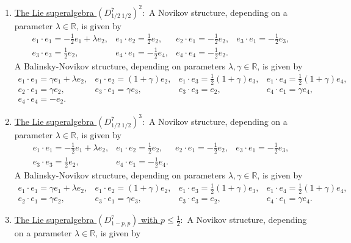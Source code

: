 \documentclass[12pt]{amsart}
\begin{document}
\begin{enumerate}
\[\begin{array}{llll}
e_2\cdot e_1=(\gamma-1)e_2, & e_3\cdot e_1=(\gamma-1)e_3, & e_3\cdot e_3= e_2, & e_4\cdot e_1=(\gamma -1)e_4,\\[2mm]
e_4\cdot e_4=e_2.
 \end{array}
 \]
 \item \underline{The Lie superalgebra $(D^{7}_{1/2\; 1/2})^2:$} A Novikov structure, depending on a parameter $\lambda \in \mathbb R$, is given by
 \[
 \begin{array}{llll}
e_1\cdot e_1=-\frac{1}{2} e_1 +\lambda e_2, &  e_1\cdot e_2=\frac{1}{2} e_2, &  e_2\cdot e_1= - \frac{1}{2} e_2,& e_3\cdot e_1=- \frac{1}{2} e_3, \\[2mm] e_3\cdot e_3=\frac{1}{2} e_2,& 
e_4 \cdot e_1=-\frac{1}{2} e_4, &  e_4\cdot e_4=-\frac{1}{2}e_2.
\end{array}
 \]
A Balinsky-Novikov structure, depending on parameters $\lambda, \gamma \in \mathbb R$,  is given by 
 \[
 \begin{array}{llll}
e_1 \cdot e_1= \gamma e_1+\lambda e_2, & e_1\cdot e_2= (1+\gamma) e_2, & e_1\cdot e_3=\frac{1}{2}(1+\gamma )e_3, & e_1\cdot e_4= \frac{1}{2}(1+\gamma)e_4,\\[2mm]
e_2\cdot e_1=\gamma e_2, & e_3\cdot e_1=\gamma e_3, & e_3\cdot e_3= e_2, & e_4\cdot e_1=\gamma e_4,\\[2mm]
e_4\cdot e_4=- e_2.
 \end{array}
 \]
  \item \underline{The Lie superalgebra $(D^{7}_{1/2 \; 1/2})^3:$} A Novikov structure, depending on a parameter $\lambda \in \mathbb R$, is given by
 \[
 \begin{array}{llll}
e_1\cdot e_1=-\frac{1}{2} e_1 +\lambda e_2, &  e_1\cdot e_2=\frac{1}{2} e_2, &  e_2\cdot e_1= - \frac{1}{2} e_2, &  e_3\cdot e_1=- \frac{1}{2} e_3, \\[2mm] e_3\cdot e_3=\frac{1}{2} e_2,& 
e_4 \cdot e_1=-\frac{1}{2} e_4.
\end{array}
 \]
A Balinsky-Novikov structure, depending on parameters $\lambda, \gamma \in \mathbb R$, is given by
 \[
 \begin{array}{llll}
e_1 \cdot e_1= \gamma e_1+\lambda e_2, & e_1\cdot e_2= (1+\gamma) e_2, & e_1\cdot e_3=\frac{1}{2}(1+\gamma )e_3, & e_1\cdot e_4= \frac{1}{2}(1+\gamma)e_4,\\[2mm]
e_2\cdot e_1=\gamma e_2, & e_3\cdot e_1=\gamma e_3, & e_3\cdot e_3= e_2, & e_4\cdot e_1=\gamma e_4.
 \end{array}
 \]
  \item \underline{The Lie superalgebra $(D^{7}_{1-p,p})$ with $p\leq \frac{1}{2}:$} A Novikov structure, depending on a parameter $\lambda \in \mathbb R$, is given by 

\end{enumerate}
\end{document}
